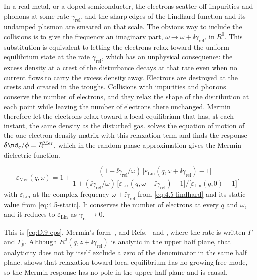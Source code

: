 In a real metal, or a doped semiconductor, the electrons scatter off impurities and phonons at some rate $\gamma_{\mathrm{rel}}$, and the sharp edges of the Lindhard function and its undamped plasmon are smeared on that scale. The obvious way to include the collisions is to give the frequency an imaginary part, $\omega \to \omega + \ii\gamma_{\mathrm{rel}}$, in $R^0$. This substitution is equivalent to letting the electrons relax toward the uniform equilibrium state at the rate $\gamma_{\mathrm{rel}}$, which has an unphysical consequence: the excess density at a crest of the disturbance decays at that rate even when no current flows to carry the excess density away. Electrons are destroyed at the crests and created in the troughs. Collisions with impurities and phonons conserve the number of electrons, and they relax the shape of the distribution at each point while leaving the number of electrons there unchanged. Mermin~\cite{mermin1970lindhard} therefore let the electrons relax toward a local equilibrium that has, at each instant, the same density as the disturbed gas.  solves the equation of motion of the one-electron density matrix with this relaxation term and finds the response $\delta\nd_e/\phi = R^{\mathrm{Mer}}$, which in the random-phase approximation gives the Mermin dielectric function.
\begin{keyresult}
\begin{equation}
  \varepsilon_{\mathrm{Mer}}(q,\omega) = 1 + \frac{(1 + \ii\gamma_{\mathrm{rel}}/\omega)\,\bigl[\varepsilon_{\mathrm{Lin}}(q,\omega + \ii\gamma_{\mathrm{rel}}) - 1\bigr]}{1 + (\ii\gamma_{\mathrm{rel}}/\omega)\,\bigl[\varepsilon_{\mathrm{Lin}}(q,\omega + \ii\gamma_{\mathrm{rel}}) - 1\bigr]/\bigl[\varepsilon_{\mathrm{Lin}}(q,0) - 1\bigr]} ,
  \label{eq:4.5-mermin}
\end{equation}
with $\varepsilon_{\mathrm{Lin}}$ at the complex frequency $\omega + \ii\gamma_{\mathrm{rel}}$ from \cref{eq:4.5-lindhard} and its static value from \cref{eq:4.5-static}. It conserves the number of electrons at every $q$ and $\omega$, and it reduces to $\varepsilon_{\mathrm{Lin}}$ as $\gamma_{\mathrm{rel}} \to 0$.
\end{keyresult}
This is \cref{eq:D.9-eps}, Mermin's form~\cite{mermin1970lindhard}, and Refs.~\cite[Eq.~(19)]{knapen2021dark} and \cite[Eq.~(168)]{kahn2022searches}, where the rate is written $\varGamma$ and $\varGamma_p$. Although $R^0(q, z + \ii\gamma_{\mathrm{rel}})$ is analytic in the upper half plane, that analyticity does not by itself exclude a zero of the denominator in the same half plane.  shows that relaxation toward local equilibrium has no growing free mode, so the Mermin response has no pole in the upper half plane and is causal.

